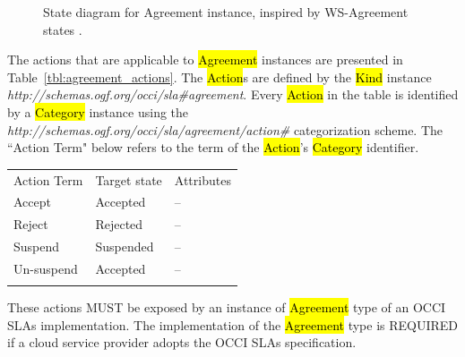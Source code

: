 \documentclass[10pt,a4paper]{article}
\begin{document}
\begin{figure}[!h]
	{\centering {} \par}
	\caption{State diagram for Agreement instance, inspired by WS-Agreement states \cite{ws-agreeement:2007} .}
	\label{fig:agreement-states}
\end{figure}


The actions that are applicable to \hl{Agreement} instances are presented in Table~\ref{tbl:agreement_actions}. The \hl{Action}s are defined by the \hl{Kind} instance \textit{http://schemas.ogf.org/occi/sla\#agreement}. Every \hl{Action} in the table is identified by a \hl{Category} instance using the \textit{http://schemas.ogf.org/occi/sla/agreement/action\#} categorization scheme. The “Action Term" below refers to the term of the \hl{Action}'s \hl{Category} identifier.


{
	\begin{tabular}{lll}
	\toprule
	Action Term & Target state & Attributes \\
	\colrule
	Accept & Accepted & -- \\
	Reject & Rejected & -- \\
	Suspend & Suspended & -- \\
	Un-suspend & Accepted & -- \\
	\botrule
	\end{tabular}
}


These actions MUST be exposed by an instance of \hl{Agreement} type of an OCCI SLAs implementation. The implementation of the \hl{Agreement} type is REQUIRED if a cloud service provider adopts the OCCI SLAs specification. 
\end{document}
